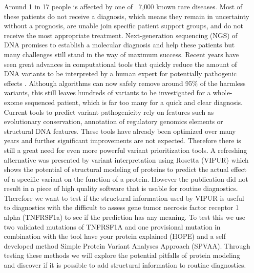 Around 1 in 17 people is affected by one of ~7,000 known rare diseases. Most of these patients do not receive a diagnosis, which means they remain in uncertainty without a prognosis, are unable join specific patient support groups, and do not receive the most appropriate treatment.
Next-generation sequencing (NGS) of DNA promises to establish a molecular diagnosis and help these patients but many challenges still stand in the way of maximum success.
Recent years have seen great advances in computational tools that quickly reduce the amount of DNA variants to be interpreted by a human expert for potentially pathogenic effects \cite{van_der_velde_gavin:_2017}. Although algorithms can now safely remove around 95\% of the harmless variants, this still leaves hundreds of variants to be investigated for a whole-exome sequenced patient, which is far too many for a quick and clear diagnosis. Current tools to predict variant pathogenicity rely on features such as evolutionary conservation, annotation of regulatory genomics elements or structural DNA features. These tools have already been optimized over many years and further significant improvements are not expected. Therefore there is still a great need for even more powerful variant prioritization tools. 
A refreshing alternative was presented by variant interpretation using Rosetta (VIPUR) \cite{baugh_robust_2016} which shows the potential of structural modeling of proteins to predict the actual effect of a specific variant on the function of a protein. However the publication did not result in a piece of high quality software that is usable for routine diagnostics. Therefore we want to test if the structural information used by VIPUR is useful to diagnostics with the difficult to assess gene tumor necrosis factor receptor 1 alpha (TNFRSF1a) to see if the prediction has any meaning. To test this we use two validated mutations of TNFRSF1A and one provisional mutation in combination with the tool have your protein explained (HOPE) \cite{venselaar_protein_2010} and a self developed method Simple Protein Variant Analyses Approach (SPVAA). Through testing these methods we will explore the potential pitfalls of protein modeling and discover if it is possible to add structural information to routine diagnostics.
